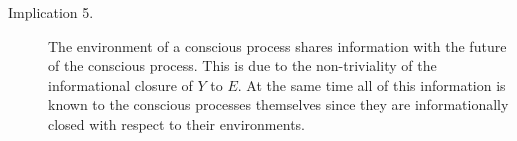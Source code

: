 \documentclass[utf8]{article}
\begin{document}
\begin{description}
            
            
            
            
            
            

            
            \item[Implication 5.] The environment of a conscious process shares information with the future of the conscious process. This is due to the non-triviality of the informational closure of $Y$ to $E$. 
            At the same time all of this information is known to the conscious processes themselves since they are informationally closed with respect to their environments. 
            

\end{description}
\end{document}

